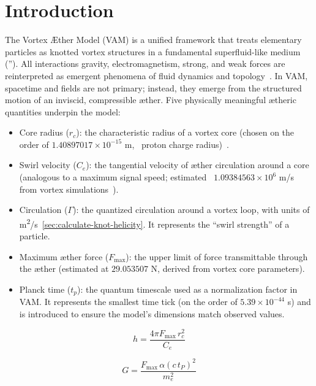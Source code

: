 \section{Introduction}

The Vortex Æther Model (VAM) is a unified framework that treats elementary particles as knotted vortex structures in a fundamental superfluid-like medium (\textquotedblright). All interactions \textendash gravity, electromagnetism, strong, and weak forces \textendash are reinterpreted as emergent phenomena of fluid dynamics and topology~\cite{VAM4}. In VAM, spacetime and fields are not primary; instead, they emerge from the structured motion of an inviscid, compressible æther. Five physically meaningful ætheric quantities underpin the model:

\begin{itemize}
    \item Core radius ($r_c$): the characteristic radius of a vortex core (chosen on the order of $1.40897017 \times 10^{-15}$ m, ~proton charge radius)~\cite{VAM4}.
    \item Swirl velocity ($C_e$): the tangential velocity of æther circulation around a core (analogous to a maximum signal speed; estimated ~$1.09384563 \times 10^6$ m/s from vortex simulations~\cite{VAM4}).
    \item Circulation ($\Gamma$): the quantized circulation around a vortex loop, with units of m\textsuperscript{2}/s~\ref{sec:calculate-knot-helicity}. It represents the ``swirl strength'' of a particle.
    \item Maximum æther force ($F_{\max}$): the upper limit of force transmittable through the æther (estimated at $29.053507$ N, derived from vortex core parameters).
    \item Planck time ($t_p$): the quantum timescale used as a normalization factor in VAM. It represents the smallest time tick (on the order of $5.39\times10^{-44}$ s) and is introduced to ensure the model's dimensions match observed values.
    \label{sec:coreconstants}
\end{itemize}

\begin{minipage}{0.48\textwidth}
\begin {equation}
        \boxed{h=\frac{4\pi F_{\max }\,r_c^{2}}{C_e}}
    \label{eq:plancks-constants}
\end{equation}
\end{minipage}
\hfill
\begin{minipage}{0.48\textwidth}
\begin {equation}
\boxed{G=\frac{F_{\max}\,\alpha(c\,t_P)^{2}}{m_e^{2}}}
\label{eq:newtons-constants}
\end{equation}
\end{minipage}

